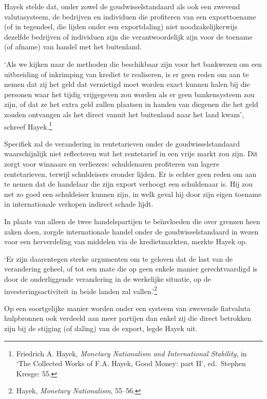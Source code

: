 \documentclass[
  a5paper,
  smalldemyvopaper,11pt,twoside,onecolumn,openright,extrafontsizes,
hidelinks]{memoir}
\renewenvironment{quote}%
               {\list{}{\rightmargin=.3cm\leftmargin=.3cm}%
                \itshape \item[]}%
               {\endlist}
\begin{document}
Hayek stelde dat, onder zowel de goudwisselstandaard als ook een zwevend
valutasysteem, de bedrijven en individuen die profiteren van een
exporttoename (of in tegendeel, die lijden onder een exportdaling) niet
noodzakelijkerwijs dezelfde bedrijven of individuen zijn die
verantwoordelijk zijn voor de toename (of afname) van handel met het
buitenland.

`Als we kijken naar de methoden die beschikbaar zijn voor het bankwezen
om een uitbreiding of inkrimping van krediet te realiseren, is er geen
reden om aan te nemen dat zij het geld dat vernietigd moet worden exact
kunnen halen bij die personen waar het tijdig vrijgegeven zou worden als
er geen bankensysteem zou zijn, of dat ze het extra geld zullen plaatsen
in handen van diegenen die het geld zouden ontvangen als het direct
vanuit het buitenland naar het land kwam', schreef Hayek.\footnote{\hspace{0pt}Friedrich
  A. Hayek, \emph{Monetary Nationalism and International Stability}, in
  `The Collected Works of F.A. Hayek, Good Money: part II', ed.~Stephen
  Kresge: 55.}

Specifiek zal de verandering in rentetarieven onder de
goudwisselstandaard waarschijnlijk niet reflecteren wat het rentetarief
in een vrije markt zou zijn. Dit zorgt voor winnaars en verliezers:
schuldenaren profiteren van lagere rentetarieven, terwijl schuldeisers
eronder lijden. Er is echter geen reden om aan te nemen dat de handelaar
die zijn export verhoogt een schuldenaar is. Hij zou net zo goed een
schuldeiser kunnen zijn, in welk geval hij door zijn eigen toename in
internationale verkopen indirect schade lijdt.

In plaats van alleen de twee handelspartijen te beïnvloeden die over
grenzen heen zaken doen, zorgde internationale handel onder de
goudwisselstandaard in wezen voor een herverdeling van middelen via de
kredietmarkten, merkte Hayek op.

\begin{quote}
`Er zijn daarentegen sterke argumenten om te geloven dat de last van de
verandering geheel, of tot een mate die op geen enkele manier
gerechtvaardigd is door de onderliggende verandering in de werkelijke
situatie, op de investeringsactiviteit in beide landen zal
vallen.'\footnote{\hspace{0pt}Hayek, \emph{Monetary Nationalism},
  55--56.}
\end{quote}

Op een soortgelijke manier worden onder een systeem van zwevende
fiatvaluta hulpbronnen ook verdeeld aan meer partijen dan enkel zij die
direct betrokken zijn bij de stijging (of daling) van de export, legde
Hayek uit.
\end{document}
